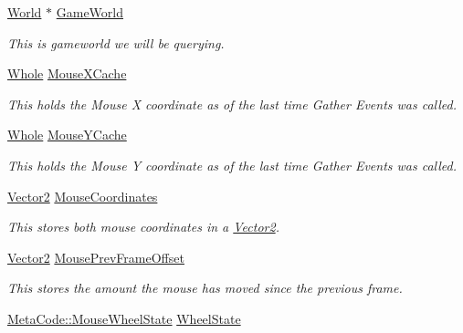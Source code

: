 \begin{DoxyCompactItemize}
\item 
\hyperlink{classphys_1_1World}{World} $\ast$ \hyperlink{classphys_1_1InputQueryTool_ab24a64fc316eefb7e88c1ed75ecee7ea}{GameWorld}
\begin{DoxyCompactList}\small\item\em This is gameworld we will be querying. \item\end{DoxyCompactList}\item 
\hyperlink{namespacephys_a460f6bc24c8dd347b05e0366ae34f34a}{Whole} \hyperlink{classphys_1_1InputQueryTool_a857f0b9ad8bb720f1daf57c9eda6e0fb}{MouseXCache}
\begin{DoxyCompactList}\small\item\em This holds the Mouse X coordinate as of the last time Gather Events was called. \item\end{DoxyCompactList}\item 
\hyperlink{namespacephys_a460f6bc24c8dd347b05e0366ae34f34a}{Whole} \hyperlink{classphys_1_1InputQueryTool_a9378af076545f92b70d853776cc6065c}{MouseYCache}
\begin{DoxyCompactList}\small\item\em This holds the Mouse Y coordinate as of the last time Gather Events was called. \item\end{DoxyCompactList}\item 
\hyperlink{classphys_1_1Vector2}{Vector2} \hyperlink{classphys_1_1InputQueryTool_a379f40bdfb0cbafb84d1dcf297cb1ea3}{MouseCoordinates}
\begin{DoxyCompactList}\small\item\em This stores both mouse coordinates in a \hyperlink{classphys_1_1Vector2}{Vector2}. \item\end{DoxyCompactList}\item 
\hyperlink{classphys_1_1Vector2}{Vector2} \hyperlink{classphys_1_1InputQueryTool_af0e34b7565836f2ebbb15b0d37d10718}{MousePrevFrameOffset}
\begin{DoxyCompactList}\small\item\em This stores the amount the mouse has moved since the previous frame. \item\end{DoxyCompactList}\item 
\hyperlink{classphys_1_1MetaCode_af9ba277d1ef071be8861e35c2b7d82d6}{MetaCode::MouseWheelState} \hyperlink{classphys_1_1InputQueryTool_af6ceb8ea79ea2fe4b881ce715090fa78}{WheelState}

\end{DoxyCompactItemize}
